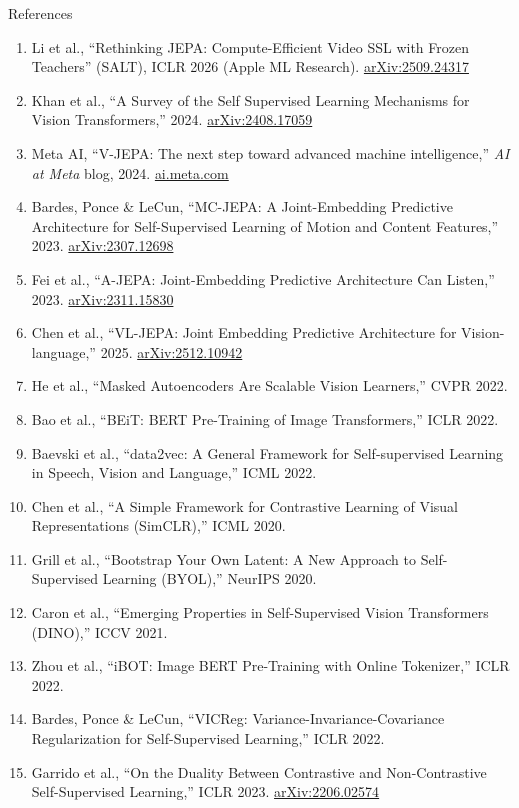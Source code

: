 \begin{frame}[allowframebreaks]{References}
\begin{enumerate}
    \item Li et al., ``Rethinking JEPA: Compute-Efficient Video SSL with Frozen Teachers'' (SALT), ICLR 2026 (Apple ML Research). \href{https://arxiv.org/abs/2509.24317}{arXiv:2509.24317}
    \item Khan et al., ``A Survey of the Self Supervised Learning Mechanisms for Vision Transformers,'' 2024. \href{https://arxiv.org/abs/2408.17059}{arXiv:2408.17059}
    \item Meta AI, ``V-JEPA: The next step toward advanced machine intelligence,'' \emph{AI at Meta} blog, 2024. \href{https://ai.meta.com/blog/v-jepa-yann-lecun-ai-model-video-joint-embedding-predictive-architecture/}{ai.meta.com}
    \item Bardes, Ponce \& LeCun, ``MC-JEPA: A Joint-Embedding Predictive Architecture for Self-Supervised Learning of Motion and Content Features,'' 2023. \href{https://arxiv.org/abs/2307.12698}{arXiv:2307.12698}
    \item Fei et al., ``A-JEPA: Joint-Embedding Predictive Architecture Can Listen,'' 2023. \href{https://arxiv.org/abs/2311.15830}{arXiv:2311.15830}
    \item Chen et al., ``VL-JEPA: Joint Embedding Predictive Architecture for Vision-language,'' 2025. \href{https://arxiv.org/abs/2512.10942}{arXiv:2512.10942}
    \item He et al., ``Masked Autoencoders Are Scalable Vision Learners,'' CVPR 2022.
    \item Bao et al., ``BEiT: BERT Pre-Training of Image Transformers,'' ICLR 2022.
    \item Baevski et al., ``data2vec: A General Framework for Self-supervised Learning in Speech, Vision and Language,'' ICML 2022.
    \item Chen et al., ``A Simple Framework for Contrastive Learning of Visual Representations (SimCLR),'' ICML 2020.
    \item Grill et al., ``Bootstrap Your Own Latent: A New Approach to Self-Supervised Learning (BYOL),'' NeurIPS 2020.
    \item Caron et al., ``Emerging Properties in Self-Supervised Vision Transformers (DINO),'' ICCV 2021.
    \item Zhou et al., ``iBOT: Image BERT Pre-Training with Online Tokenizer,'' ICLR 2022.
    \item Bardes, Ponce \& LeCun, ``VICReg: Variance-Invariance-Covariance Regularization for Self-Supervised Learning,'' ICLR 2022.
    \item Garrido et al., ``On the Duality Between Contrastive and Non-Contrastive Self-Supervised Learning,'' ICLR 2023. \href{https://arxiv.org/abs/2206.02574}{arXiv:2206.02574}

\end{enumerate}
\end{frame}
